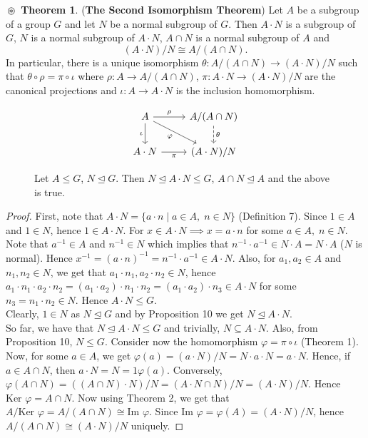 \documentclass{article}
\theoremstyle{definition}
\newtheorem{theorem}{$\boxed{\boxed{\circledast}}$ Theorem}
\theoremstyle{remark}
\theoremstyle{definition}
\theoremstyle{definition}
\theoremstyle{definition}
\theoremstyle{proof}
\newcommand{\inv}[1]{#1^{-1}}
\newcommand{\image}[0]{\text{Im }}
\newcommand{\kernel}[0]{\text{Ker }}
\newcommand{\nsg}[0]{\trianglelefteq}
\newcommand{\isomorph}{\cong}
\begin{document}
\begin{theorem}
	(\textbf{The Second Isomorphism Theorem}) Let $ A $ be a subgroup of a group $ G $ and let $ N $ be a normal subgroup of $ G $. Then $ A\cdot N $ is a subgroup of $ G $, $ N $ is a normal subgroup of $ A\cdot N $, $ A\cap N $ is a normal subgroup of $ A $ and 
	\[(A\cdot N) / N \isomorph A/(A\cap N).\]
	In particular, there is a unique isomorphism $ \theta : A/(A\cap N) \to (A\cdot N) / N $ such that $ \theta \circ \rho = \pi \circ \iota $ where $ \rho : A\to A/(A\cap N)$, $ \pi : A\cdot N \to (A\cdot N)/N $ are the canonical projections and $ \iota : A \to  A\cdot N $ is the inclusion homomorphism.
	\begin{figure}[h!]
		\[\begin{tikzcd}
			A \arrow{r}{\rho} \arrow[swap]{d}{\iota} \arrow[swap]{dr}{\varphi} &A/(A\cap N) \arrow[dashed]{d}{\theta}\\
			A\cdot N \arrow[swap]{r}{\pi} &(A\cdot N)/N
		\end{tikzcd}\]
	\caption{Let $ A \le G $, $ N\nsg G $. Then $N\nsg A\cdot N \le G$, $ A\cap N \nsg A $ and the above is true. }
	\end{figure}
\end{theorem}
\begin{proof}
	First, note that $ A\cdot N = \{a\cdot n\;\vert\; a\in A, \;n\in N\} $ (Definition 7). Since $ 1\in A $ and $ 1 \in N$, hence $ 1\in A\cdot N $. For $ x \in A\cdot N \implies x= a\cdot n$ for some $ a\in A,\;n\in N $. Note that $ \inv{a}\in A $ and $ \inv{n}\in N $ which implies that $ \inv{n}\cdot \inv{a}\in N\cdot A = N\cdot A$ ($ N $ is normal). Hence $\inv{x}= \inv{(a\cdot n)} = \inv{n}\cdot \inv{a} \in A\cdot N $. Also, for $ a_1,a_2 \in A $ and $ n_1,n_2 \in N $, we get that $ a_1\cdot n_1, a_2\cdot n_2 \in N $, hence $ a_1\cdot n_1 \cdot a_2\cdot n_2 = (a_1\cdot a_2)\cdot n_1\cdot n_2 = (a_1\cdot a_2 )\cdot n_3 \in A\cdot N$ for some $ n_3 = n_1\cdot n_2 \in N $. Hence $ A\cdot N \le G$. \\
	Clearly, $ 1\in N $ as $ N\nsg G $ and by Proposition 10 we get $ N\nsg A\cdot N $.\\
	So far, we have that $ N\nsg A\cdot N \le G$ and trivially, $ N \subseteq A\cdot N $. Also, from Proposition 10, $ N\le G $. Consider now the homomorphism $ \varphi = \pi \circ \iota $ (Theorem 1). Now, for some $ a\in A $, we get $ \varphi(a) = (a\cdot N)/N = N\cdot a\cdot N = a\cdot N$. Hence, if $ a\in A\cap N $, then $ a\cdot N = N =1\varphi(a) $. Conversely, $ \varphi(A\cap N) = ((A\cap N )\cdot N)/N = (A\cdot N \cap N)/N = (A\cdot N)/N$. Hence $ \kernel \varphi = A\cap N $. Now using Theorem 2, we get that $ A/\kernel \varphi = A/(A\cap N) \isomorph \image \varphi$. Since $ \image \varphi = \varphi(A) = (A\cdot N)/N $, hence $ A/(A\cap N) \isomorph (A\cdot N)/N $ uniquely. 
\end{proof}
\hrulefill
\newpage
\end{document}

